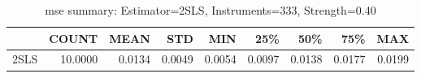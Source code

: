 \begin{table}[ht]
\centering
\caption{mse summary: Estimator=2SLS, Instruments=333, Strength=0.40}
\begin{tabular}{lrrrrrrrr}
\toprule
 & COUNT & MEAN & STD & MIN & 25\% & 50\% & 75\% & MAX \\
\midrule
2SLS & 10.0000 & 0.0134 & 0.0049 & 0.0054 & 0.0097 & 0.0138 & 0.0177 & 0.0199 \\
\bottomrule
\end{tabular}
\end{table}
